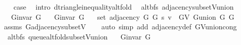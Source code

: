\begin{isabellebody}
\ \ \isamarkupfalse%
\ {\isacharquery}{\kern0pt}case\ \isamarkupfalse%
\ {\isacharparenleft}{\kern0pt}intro\ d{\isacharunderscore}{\kern0pt}triangle{\isacharunderscore}{\kern0pt}inequality{\isacharunderscore}{\kern0pt}alt{\isacharunderscore}{\kern0pt}fold{\isacharparenright}{\kern0pt}\isanewline
{}\isamarkupfalse%
%
\endisatagproof
{\isafoldproof}%
%
\isadelimproof
\isanewline
%
\endisadelimproof
%
\isadeliminvisible
\isanewline
%
\endisadeliminvisible
%
\isataginvisible
{}\isamarkupfalse%
\ {\isacharparenleft}{\kern0pt}\ alt{\isacharunderscore}{\kern0pt}bfs{\isacharparenright}{\kern0pt}\ adjacency{\isacharunderscore}{\kern0pt}subset{\isacharunderscore}{\kern0pt}V{\isacharunderscore}{\kern0pt}union{\isacharcolon}{\kern0pt}\isanewline
\ \ \ {\isachardoublequoteopen}G{\isachardot}{\kern0pt}invar\ G{}{\isachardoublequoteclose}\isanewline
\ \ \ {\isachardoublequoteopen}G{\isachardot}{\kern0pt}invar\ G{}{\isachardoublequoteclose}\isanewline
\ \ \ {\isachardoublequoteopen}set\ {\isacharparenleft}{\kern0pt}adjacency\ G{}\ G{}\ s\ v{\isacharparenright}{\kern0pt}\ {\isasymsubseteq}\ G{\isachardot}{\kern0pt}V\ {\isacharparenleft}{\kern0pt}G{\isachardot}{\kern0pt}union\ G{}\ G{}{\isacharparenright}{\kern0pt}{\isachardoublequoteclose}%
\endisataginvisible
{\isafoldinvisible}%
%
\isadeliminvisible
\isanewline
%
\endisadeliminvisible
%
\isadelimproof
\ \ %
\endisadelimproof
%
\isatagproof
{}\isamarkupfalse%
\ assms\ G{\isachardot}{\kern0pt}adjacency{\isacharunderscore}{\kern0pt}subset{\isacharunderscore}{\kern0pt}V\isanewline
\ \ \isamarkupfalse%
\ {\isacharparenleft}{\kern0pt}auto\ simp\ add{\isacharcolon}{\kern0pt}\ adjacency{\isacharunderscore}{\kern0pt}def\ G{\isachardot}{\kern0pt}V{\isacharunderscore}{\kern0pt}union{\isacharunderscore}{\kern0pt}cong{\isacharparenright}{\kern0pt}%
\endisatagproof
{\isafoldproof}%
%
\isadelimproof
\isanewline
%
\endisadelimproof
%
\isadeliminvisible
\isanewline
%
\endisadeliminvisible
%
\isataginvisible
{}\isamarkupfalse%
\ {\isacharparenleft}{\kern0pt}\ alt{\isacharunderscore}{\kern0pt}bfs{\isacharparenright}{\kern0pt}\ queue{\isacharunderscore}{\kern0pt}alt{\isacharunderscore}{\kern0pt}fold{\isacharunderscore}{\kern0pt}subset{\isacharunderscore}{\kern0pt}V{\isacharunderscore}{\kern0pt}union{\isacharcolon}{\kern0pt}\isanewline
\ \ \ {\isachardoublequoteopen}G{\isachardot}{\kern0pt}invar\ G{}{\isachardoublequoteclose}\isanewline

\end{isabellebody}
